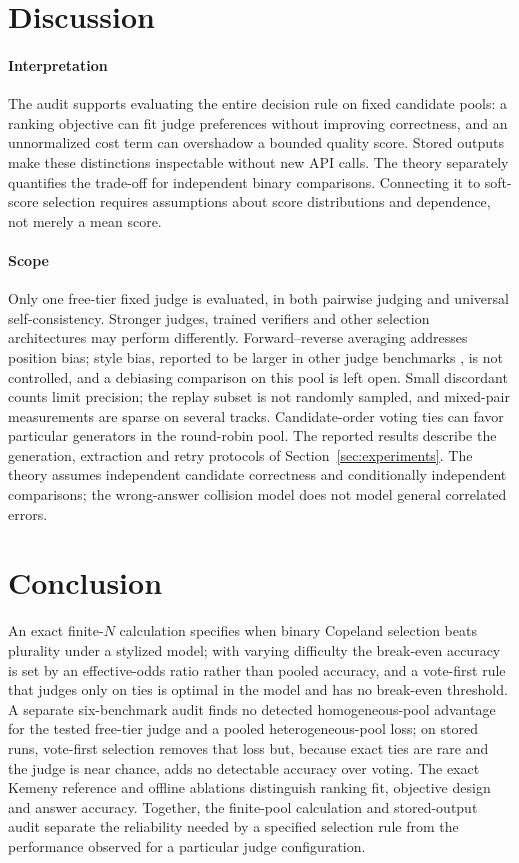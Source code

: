 \documentclass[preprint,11pt,number,sort&compress]{elsarticle}
\begin{document}
\section{Discussion}

\paragraph{Interpretation}
The audit supports evaluating the entire decision rule on fixed candidate
pools: a ranking objective can fit judge preferences without improving
correctness, and an unnormalized cost term can overshadow a bounded quality
score. Stored outputs make these distinctions inspectable without new API
calls. The theory separately quantifies the trade-off for independent binary
comparisons. Connecting it to soft-score selection requires assumptions
about score distributions and dependence, not merely a mean score.

\paragraph{Scope}
\label{sec:future}

Only one free-tier fixed judge is evaluated, in both pairwise judging and universal
self-consistency. Stronger
judges, trained verifiers and other selection architectures may perform
differently. Forward--reverse averaging addresses position bias; style bias,
reported to be larger in other judge benchmarks \citep{soumik2026judging},
is not controlled, and a debiasing comparison on this pool is left open. Small discordant counts limit precision; the replay subset is
not randomly sampled, and mixed-pair measurements are sparse on several
tracks. Candidate-order voting ties can favor particular generators in the
round-robin pool. The reported results describe the generation, extraction
and retry protocols of Section~\ref{sec:experiments}. The theory assumes
independent candidate correctness and
conditionally independent comparisons; the wrong-answer collision model
does not model general correlated errors.

\section{Conclusion}

An exact finite-$N$ calculation specifies when binary Copeland selection
beats plurality under a stylized model; with varying difficulty the
break-even accuracy is set by an effective-odds ratio rather than pooled
accuracy, and a vote-first rule that judges only on ties is optimal in the model
and has no break-even threshold. A separate six-benchmark audit
finds no detected homogeneous-pool advantage for the tested free-tier judge
and a pooled heterogeneous-pool loss; on stored runs, vote-first selection
removes that loss but, because exact ties are rare and the judge is near
chance, adds no detectable accuracy over voting. The exact Kemeny reference and
offline ablations distinguish ranking fit, objective design and answer
accuracy. Together, the finite-pool calculation and stored-output audit
separate the reliability needed by a specified selection rule from the
performance observed for a particular judge configuration.
\end{document}
